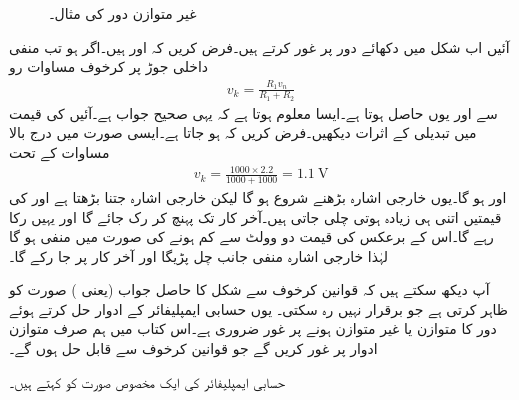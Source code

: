 \begin{figure}
\centering
{}
\caption{غیر متوازن دور کی مثال۔}
\label{شکل_حسابی_غیر_متوازن}
\end{figure}
آئیں اب شکل  میں دکھائے دور پر غور کرتے ہیں۔فرض کریں کہ  اور  ہیں۔اگر  ہو تب منفی داخلی جوڑ پر کرخوف مساوات رو
\begin{align}
v_k=\frac{R_1 v_n}{R_1+R_2}
\end{align} 
سے  اور یوں  حاصل ہوتا ہے۔ایسا معلوم ہوتا ہے کہ یہی صحیح جواب ہے۔آئیں  کی قیمت میں تبدیلی کے اثرات دیکھیں۔فرض کریں کہ  ہو جاتا ہے۔ایسی صورت میں درج بالا مساوات کے تحت
\begin{align*}
v_k=\frac{1000\times 2.2}{1000+1000}=\SI{1.1}{\volt}
\end{align*}
اور  ہو گا۔یوں خارجی اشارہ بڑھنے شروع ہو گا لیکن خارجی اشارہ جتنا بڑھتا ہے  اور  کی قیمتیں اتنی ہی  زیادہ ہوتی چلی جاتی ہیں۔آخر کار  تک پہنچ کر رک جائے گا اور یہیں رکا رہے گا۔اس کے برعکس  کی قیمت دو وولٹ سے کم ہونے کی صورت میں  منفی ہو گا لہٰذا خارجی اشارہ منفی جانب چل پڑیگا اور آخر کار  پر جا رکے گا۔

آپ دیکھ سکتے ہیں کہ قوانین کرخوف سے شکل   کا حاصل جواب (یعنی )  صورت کو ظاہر کرتی  ہے جو برقرار نہیں رہ  سکتی۔ یوں حسابی ایمپلیفائر کے ادوار حل کرتے ہوئے دور کا متوازن یا غیر متوازن ہونے پر غور ضروری ہے۔اس کتاب میں ہم صرف متوازن ادوار پر غور کریں گے جو قوانین کرخوف سے قابل حل ہوں گے۔

حسابی ایمپلیفائر کی ایک مخصوص صورت کو  کہتے ہیں۔

